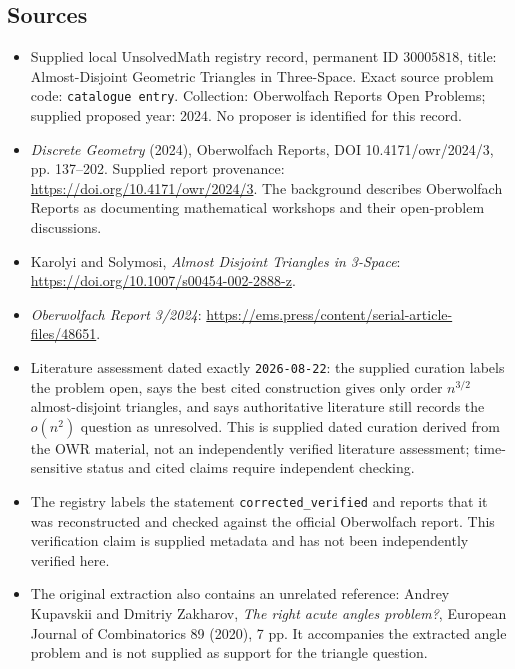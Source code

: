 \documentclass[11pt]{article}
\begin{document}
\subsection{Sources}
\begin{itemize}
\item Supplied local UnsolvedMath registry record, permanent ID \(30005818\), title: Almost-Disjoint Geometric Triangles in Three-Space. Exact source problem code: \texttt{catalogue entry}. Collection: Oberwolfach Reports Open Problems; supplied proposed year: 2024. No proposer is identified for this record.
\item \emph{Discrete Geometry} (2024), Oberwolfach Reports, DOI 10.4171/owr/2024/3, pp. 137--202. Supplied report provenance: \url{https://doi.org/10.4171/owr/2024/3}. The background describes Oberwolfach Reports as documenting mathematical workshops and their open-problem discussions.
\item Karolyi and Solymosi, \emph{Almost Disjoint Triangles in 3-Space}: \url{https://doi.org/10.1007/s00454-002-2888-z}.
\item \emph{Oberwolfach Report 3/2024}: \url{https://ems.press/content/serial-article-files/48651}.
\item Literature assessment dated exactly \texttt{2026-08-22}: the supplied curation labels the problem open, says the best cited construction gives only order \(n^{3/2}\) almost-disjoint triangles, and says authoritative literature still records the \(o(n^2)\) question as unresolved. This is supplied dated curation derived from the OWR material, not an independently verified literature assessment; time-sensitive status and cited claims require independent checking.
\item The registry labels the statement \texttt{corrected\_verified} and reports that it was reconstructed and checked against the official Oberwolfach report. This verification claim is supplied metadata and has not been independently verified here.
\item The original extraction also contains an unrelated reference: Andrey Kupavskii and Dmitriy Zakharov, \emph{The right acute angles problem?}, European Journal of Combinatorics 89 (2020), 7 pp. It accompanies the extracted angle problem and is not supplied as support for the triangle question.
\end{itemize}
\end{document}
